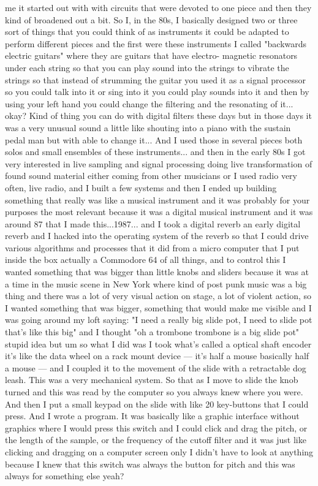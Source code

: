 me it started out with with circuits that were devoted to one piece and then they kind of broadened out a bit. So I, in the 80s, I basically designed two or three sort of things that you could think of as instruments it could be adapted to perform different pieces and the first were these instruments I called "backwards electric guitars" where they are guitars that have electro- magnetic resonators under each string so that you can play sound into the strings to vibrate the strings so that instead of strumming the guitar you used it as a signal processor so you could talk into it or sing into it you could play sounds into it and then by using your left hand you could change the filtering and the resonating of it... okay? Kind of thing you can do with digital filters these days but in those days it was a very unusual sound a little like shouting into a piano with the sustain pedal man but with able to change it... And I used those in several pieces both solos and small ensembles of these instruments... and then in the early 80s I got very interested in live sampling and signal processing doing live transformation of found sound material either coming from other musicians or I used radio very often, live radio, and I built a few systems and then I ended up building something that really was like a musical instrument and it was probably for your purposes the most relevant because it was a digital musical instrument and it was around 87 that I made this...1987... and I took a digital reverb an early digital reverb and I hacked into the operating system of the reverb so that I could drive various algorithms and processes that it did from a micro computer that I put inside the box actually a Commodore 64 of all things, and to control this I wanted something that was bigger than little knobs and sliders because it was at a time in the music scene in New York where kind of post punk music was a big thing and there was a lot of very visual action on stage, a lot of violent action, so I wanted something that was bigger, something that would make me visible and I was going around my loft saying: "I need a really big slide pot, I need to slide pot that's like this big" and I thought "oh a trombone trombone is a big slide pot" stupid idea but um so what I did was I took what's called a optical shaft encoder it's like the data wheel on a rack mount device — it's half a mouse basically half a mouse — and I coupled it to the movement of the slide with a retractable dog leash. This was a very mechanical system. So that as I move to slide the knob turned and this was read by the computer so you always knew where you were. And then I put a small keypad on the slide with like 20 key-buttons that I could press. And I wrote a program. It was basically like a graphic interface without graphics where I would press this switch and I could click and drag the pitch, or the length of the sample, or the frequency of the cutoff filter and it was just like clicking and dragging on a computer screen only I didn't have to look at anything because I knew that this switch was always the button for pitch and this was always for something else yeah? 

